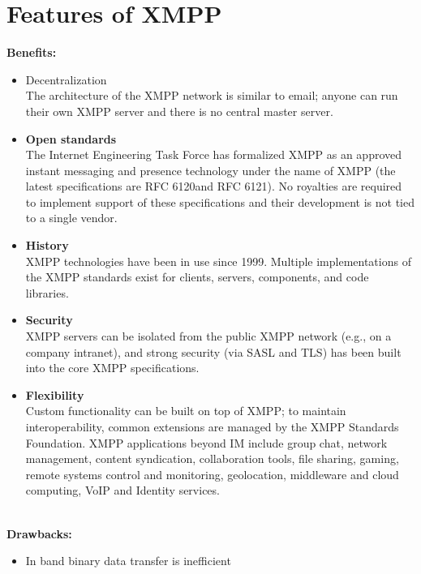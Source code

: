 \documentclass{SureshLimkar}
\begin{document}
\section {Features of XMPP}
\hspace{0.5 in}\textbf{Benefits:}\\
\begin{itemize}
 \item Decentralization \\
 The architecture of the XMPP network is similar to email; anyone
can run their own XMPP server and there is no central master
server.
\item \textbf{Open standards} \\
The Internet Engineering Task Force has formalized XMPP as an
approved instant messaging and presence technology under the
name of XMPP (the latest specifications are RFC 6120and RFC
6121). No royalties are required to implement support of these
specifications and their development is not tied to a single vendor.
\item \textbf{History} \\
XMPP technologies have been in use since 1999. Multiple
implementations of the XMPP standards exist for clients, servers,
components, and code libraries.
\item \textbf{Security }\\
XMPP servers can be isolated from the public XMPP network (e.g.,
on a company intranet), and strong security (via SASL and TLS) has
been built into the core XMPP specifications.
\item \textbf{Flexibility }\\
Custom functionality can be built on top of XMPP; to maintain
interoperability, common extensions are managed by the XMPP
Standards Foundation. XMPP applications beyond IM include
group chat, network management, content syndication,
collaboration tools, file sharing, gaming, remote systems control and
monitoring, geolocation, middleware and cloud computing, VoIP
and Identity services.
\end{itemize}
\\
\hspace{0.5 in}\textbf{Drawbacks:}\\
\begin{itemize}
 \item In ­band binary data transfer is inefficient
\end{itemize}
\newpage
\end{document}
